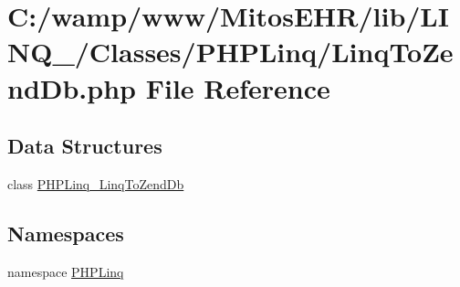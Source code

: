 \hypertarget{_linq_to_zend_db_8php}{\section{\-C\-:/wamp/www/\-Mitos\-E\-H\-R/lib/\-L\-I\-N\-Q\-\_/\-Classes/\-P\-H\-P\-Linq/\-Linq\-To\-Zend\-Db.php \-File \-Reference}
\label{_linq_to_zend_db_8php}
}
\subsection*{\-Data \-Structures}
\begin{DoxyCompactItemize}
\item 
class \hyperlink{class_p_h_p_linq___linq_to_zend_db}{\-P\-H\-P\-Linq\-\_\-\-Linq\-To\-Zend\-Db}
\end{DoxyCompactItemize}
\subsection*{\-Namespaces}
\begin{DoxyCompactItemize}
\item 
namespace \hyperlink{namespace_p_h_p_linq}{\-P\-H\-P\-Linq}
\end{DoxyCompactItemize}
